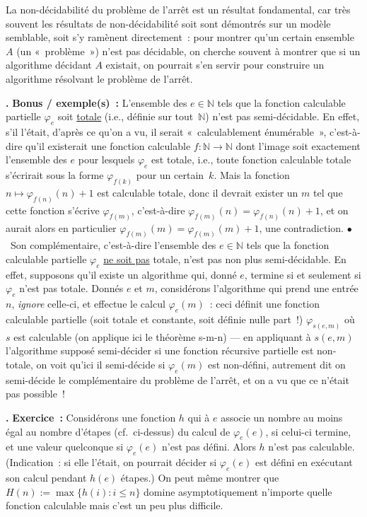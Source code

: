 \documentclass[12pt,a4paper]{article}
\theoremstyle{definition}
\newcommand\thingy{%
\refstepcounter{comcnt}\medskip\noindent\textbf{\thecomcnt.} }
\begin{document}
\medbreak

La non-décidabilité du problème de l'arrêt est un résultat
fondamental, car très souvent les résultats de non-décidabilité soit
sont démontrés sur un modèle semblable, soit s'y ramènent
directement : pour montrer qu'un certain ensemble $A$ (un
« problème ») n'est pas décidable, on cherche souvent à montrer que si
un algorithme décidant $A$ existait, on pourrait s'en servir pour
construire un algorithme résolvant le problème de l'arrêt.

{\footnotesize\thingy\label{example-set-of-total-functions}\textbf{Bonus
    / exemple(s) :} L'ensemble des $e \in \mathbb{N}$ tels que la
  fonction calculable partielle $\varphi_e$ soit \underline{totale}
  (i.e., définie sur tout $\mathbb{N}$) n'est pas semi-décidable.  En
  effet, s'il l'était, d'après ce qu'on a vu, il serait
  « calculablement énumérable », c'est-à-dire qu'il existerait une
  fonction calculable $f\colon\mathbb{N}\to\mathbb{N}$ dont l'image
  soit exactement l'ensemble des $e$ pour lesquels $\varphi_e$ est
  totale, i.e., toute fonction calculable totale s'écrirait sous la
  forme $\varphi_{f(k)}$ pour un certain $k$.  Mais la fonction $n
  \mapsto \varphi_{f(n)}(n) + 1$ est calculable totale, donc il
  devrait exister un $m$ tel que cette fonction s'écrive
  $\varphi_{f(m)}$, c'est-à-dire $\varphi_{f(m)}(n) =
  \varphi_{f(n)}(n) + 1$, et on aurait alors en particulier
  $\varphi_{f(m)}(m) = \varphi_{f(m)}(m) + 1$, une
  contradiction. $\bullet$ Son complémentaire, c'est-à-dire l'ensemble
  des $e \in \mathbb{N}$ tels que la fonction calculable partielle
  $\varphi_e$ \underline{ne soit pas} totale, n'est pas non plus
  semi-décidable.  En effet, supposons qu'il existe un algorithme qui,
  donné $e$, termine si et seulement si $\varphi_e$ n'est pas totale.
  Donnés $e$ et $m$, considérons l'algorithme qui prend une entrée
  $n$, \emph{ignore} celle-ci, et effectue le calcul $\varphi_e(m)$ :
  ceci définit une fonction calculable partielle (soit totale et
  constante, soit définie nulle part !) $\varphi_{s(e,m)}$ où $s$ est
  calculable (on applique ici le théorème s-m-n) — en appliquant à
  $s(e,m)$ l'algorithme supposé semi-décider si une fonction récursive
  partielle est non-totale, on voit qu'ici il semi-décide si
  $\varphi_e(m)$ est non-défini, autrement dit on semi-décide le
  complémentaire du problème de l'arrêt, et on a vu que ce n'était pas
  possible !\par}

{\footnotesize\thingy\textbf{Exercice :} Considérons une fonction $h$
  qui à $e$ associe un nombre au moins égal au nombre d'étapes
  (cf. ci-dessus) du calcul de $\varphi_e(e)$, si celui-ci termine, et
  une valeur quelconque si $\varphi_e(e)$ n'est pas défini.  Alors $h$
  n'est pas calculable.  (Indication : si elle l'était, on pourrait
  décider si $\varphi_e(e)$ est défini en exécutant son calcul pendant
  $h(e)$ étapes.)  On peut même montrer que $H(n) := \max\{h(i) :
  i\leq n\}$ domine asymptotiquement n'importe quelle fonction
  calculable mais c'est un peu plus difficile.\par}
\end{document}
